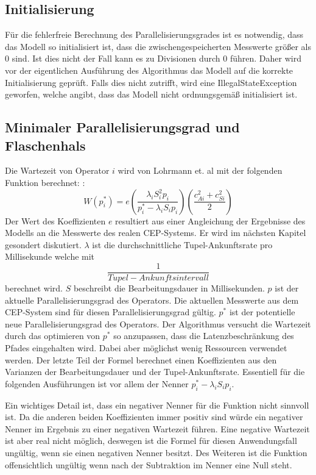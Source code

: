 \subsection{Initialisierung}
Für die fehlerfreie Berechnung des Parallelisierungsgrades ist es notwendig, dass das Modell so initialisiert ist, dass die zwischengespeicherten Messwerte größer als 0 sind.
Ist dies nicht der Fall kann es zu Divisionen durch 0 führen.
Daher wird vor der eigentlichen Ausführung des Algorithmus das Modell auf die korrekte Initialisierung geprüft. 
Falls dies nicht zutrifft, wird eine IllegalStateException geworfen, welche angibt, dass das Modell nicht ordnungsgemäß initialisiert ist.

\subsection{Minimaler Parallelisierungsgrad und Flaschenhals}
Die Wartezeit von Operator \(i\) wird von Lohrmann et. al mit der folgenden Funktion berechnet: \cite{lohrmann_elastic_2015}:
\[W(p_i^\ast) = e \left( \frac{\lambda_i {S}^{2}_{i} p_i}{p_i^\ast-\lambda_i {S}_i p_i}\right)\left(\frac{{c^{2}_{Ai}} + {c^{2}_{Si}}}{2}\right)\]
Der Wert des Koeffizienten \(e\) resultiert aus einer Angleichung der Ergebnisse des Modells an die Messwerte des realen CEP-Systems.
Er wird im nächsten Kapitel gesondert diskutiert.
\(\lambda\) ist die durchschnittliche Tupel-Ankunftsrate pro Millisekunde welche mit \[\frac{1}{Tupel-Ankunftsintervall}\] berechnet wird. 
\({S}\) beschreibt die Bearbeitungsdauer in Millisekunden.
\(p\) ist der aktuelle Parallelisierungsgrad des Operators.
Die aktuellen Messwerte aus dem CEP-System sind für diesen Parallelisierungsgrad gültig.
\(p^\ast\) ist der potentielle neue Parallelisierungsgrad des Operators.
Der Algorithmus versucht die Wartezeit durch das optimieren von \(p^\ast\) so anzupassen, dass die Latenzbeschränkung des Pfades eingehalten wird. Dabei aber möglichst wenig Ressourcen verwendet werden.
Der letzte Teil der Formel berechnet einen Koeffizienten aus den Varianzen der Bearbeitungsdauer und der Tupel-Ankunftsrate.
Essentiell für die folgenden Ausführungen ist vor allem der Nenner \(p_i^\ast-\lambda_i {S}_i p_i\).

Ein wichtiges Detail ist, dass ein negativer Nenner für die Funktion nicht sinnvoll ist.
Da die anderen beiden Koeffizienten immer positiv sind würde ein negativer Nenner im Ergebnis zu einer negativen Wartezeit führen.
Eine negative Wartezeit ist aber real nicht möglich, deswegen ist die Formel für diesen Anwendungsfall ungültig, wenn sie einen negativen Nenner besitzt.
Des Weiteren ist die Funktion offensichtlich ungültig wenn nach der Subtraktion im Nenner eine Null steht.

